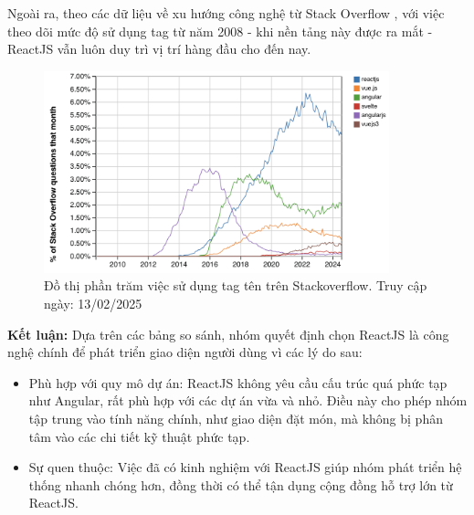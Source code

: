 \begin{enumerate}[(a)]
            Ngoài ra, theo các dữ liệu về xu hướng công nghệ từ Stack Overflow \cite{FrontendFrameworks}, với việc theo dõi mức độ sử dụng tag từ năm 2008 - khi nền tảng này được ra mắt - ReactJS vẫn luôn duy trì vị trí hàng đầu cho đến nay.

            \begin{figure}[H]
                \centering
                \includegraphics[width=10cm]{Images/react-stack-overflow.png}
                \vspace{0.5cm}
                \caption{Đồ thị phần trăm việc sử dụng tag tên trên Stackoverflow. Truy cập ngày: 13/02/2025}
                \label{fig:my_label}
            \end{figure}

            \textbf{Kết luận: } Dựa trên các bảng so sánh, nhóm quyết định chọn ReactJS là công nghệ chính để phát triển giao diện người dùng vì các lý do sau:

            \begin{itemize}
                \item Phù hợp với quy mô dự án: ReactJS không yêu cầu cấu trúc quá phức tạp như Angular, rất phù hợp với các dự án vừa và nhỏ. Điều này cho phép nhóm tập trung vào tính năng chính, như giao diện đặt món, mà không bị phân tâm vào các chi tiết kỹ thuật phức tạp.
                \item Sự quen thuộc: Việc đã có kinh nghiệm với ReactJS giúp nhóm phát triển hệ thống nhanh chóng hơn, đồng thời có thể tận dụng cộng đồng hỗ trợ lớn từ ReactJS.
            \end{itemize}


\end{enumerate}
